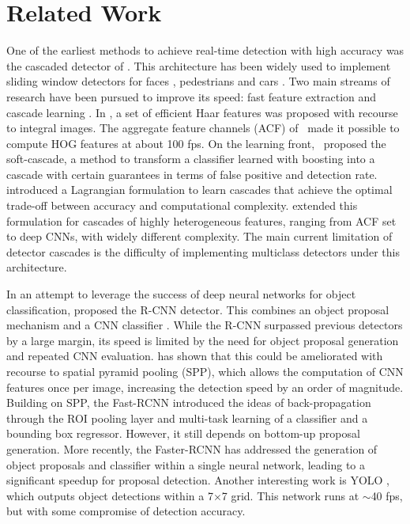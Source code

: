 \documentclass[runningheads]{llncs}
\begin{document}
\section{Related Work}

One of the earliest methods to achieve real-time detection with  high
accuracy was the cascaded detector of \cite{DBLP:journals/ijcv/ViolaJ04}.
This architecture has been widely used to implement sliding window
detectors for faces \cite{DBLP:journals/ijcv/ViolaJ04,DBLP:conf/cvpr/BourdevB05}, pedestrians \cite{DBLP:journals/pami/DollarABP14,DBLP:conf/iccv/CaiSV15} and cars \cite{DBLP:journals/tits/Ohn-BarT15}.
Two main streams of research have been pursued to improve its speed:
fast feature extraction \cite{DBLP:journals/ijcv/ViolaJ04,DBLP:journals/pami/DollarABP14} and cascade learning
\cite{DBLP:conf/cvpr/BourdevB05,DBLP:journals/jmlr/SaberianV14,DBLP:conf/iccv/CaiSV15}. In \cite{DBLP:journals/ijcv/ViolaJ04}, a set
of efficient Haar features was proposed with recourse to integral images.
The aggregate feature channels (ACF) of~\cite{DBLP:journals/pami/DollarABP14}
made it possible to compute HOG features at about 100 fps. On the learning
front,~\cite{DBLP:conf/cvpr/BourdevB05} proposed the soft-cascade, a
method to transform a classifier learned with boosting  into a cascade with
certain guarantees in terms of false positive and detection rate.
\cite{DBLP:journals/jmlr/SaberianV14} introduced a Lagrangian formulation
to learn cascades that achieve the optimal trade-off between accuracy and
computational complexity. \cite{DBLP:conf/iccv/CaiSV15} extended this
formulation for cascades of highly heterogeneous features, ranging from ACF
set to deep CNNs, with widely different complexity. The main current
limitation of detector cascades is the difficulty of implementing multiclass
detectors under this architecture.

In an attempt to leverage the success of deep neural networks for object
classification, \cite{DBLP:conf/cvpr/GirshickDDM14} proposed the R-CNN
detector. This combines an object proposal mechanism
\cite{DBLP:conf/iccv/SandeUGS11} and a CNN classifier
\cite{DBLP:conf/nips/KrizhevskySH12}. While the R-CNN surpassed previous
detectors \cite{DBLP:journals/pami/FelzenszwalbGMR10,DBLP:conf/iccv/WangYZL13}
by a large margin, its speed is limited by the
need for object proposal generation and repeated CNN evaluation.
\cite{DBLP:conf/eccv/HeZR014} has shown that this could be ameliorated
with recourse to spatial pyramid pooling (SPP), which allows the computation
of CNN features once per image, increasing
the detection speed by an order of magnitude. Building on SPP,
the Fast-RCNN \cite{DBLP:conf/iccv/Girshick15} introduced
the ideas of back-propagation through the ROI pooling layer and multi-task
learning of a classifier and a bounding box regressor. However, it still
depends on bottom-up proposal generation. More recently, the
Faster-RCNN \cite{DBLP:conf/nips/shaoqing15fasterRcnn} has addressed
the generation of object proposals and classifier within a single
neural network, leading to a significant speedup for proposal detection.
Another interesting work is YOLO \cite{DBLP:conf/cvpr/RedmonDGF16}, which
outputs object detections within a 7$\times$7 grid. This network runs
at $\sim$40 fps, but with some compromise of detection accuracy.
\end{document}

